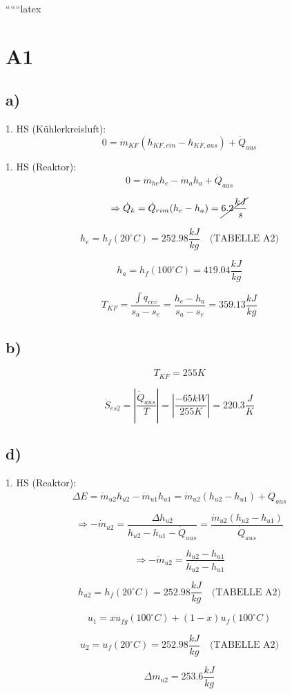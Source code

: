 
``````latex


\section*{A1}

\subsection*{a)}
1. HS (Kühlerkreisluft): \[0 = \dot{m}_{KF} (h_{KF,ein} - h_{KF,aus}) + \dot{Q}_{aus}\]

1. HS (Reaktor): \[0 = \dot{m}_{he} h_{e} - \dot{m}_{a} h_{a} + \dot{Q}_{aus}\]

\[
\Rightarrow \dot{Q}_{k} = \dot{Q}_{rim} (h_{e} - h_{a}) = \cancel{6.2 \frac{kJ}{s}}
\]

\[
h_{e} = h_{f} (20^\circ C) = 252.98 \frac{kJ}{kg} \quad \text{(TABELLE A2)}
\]

\[
h_{a} = h_{f} (100^\circ C) = 419.04 \frac{kJ}{kg}
\]

\[
T_{KF} = \frac{\int q_{rev}}{s_{a} - s_{e}} = \frac{h_{e} - h_{a}}{s_{a} - s_{e}} = 359.13 \frac{kJ}{kg}
\]

\subsection*{b)}
\[
T_{KF} = 255 K
\]

\[
\dot{S}_{es2} = \left| \frac{\dot{Q}_{aus}}{T} \right| = \left| \frac{-65 kW}{255 K} \right| = 220.3 \frac{J}{K}
\]

\subsection*{d)}
1. HS (Reaktor): \[\Delta E = \dot{m}_{u2} h_{u2} - \dot{m}_{u1} h_{u1} = \dot{m}_{u2} (h_{u2} - h_{u1}) + \dot{Q}_{aus}\]

\[
\Rightarrow -\dot{m}_{u2} = \frac{\Delta h_{u2}}{h_{u2} - h_{u1} - \dot{Q}_{aus}} = \frac{\dot{m}_{u2} (h_{u2} - h_{u1})}{\dot{Q}_{aus}}
\]

\[
\Rightarrow -\dot{m}_{u2} = \frac{h_{u2} - h_{u1}}{h_{u2} - h_{u1}}
\]

\[
h_{u2} = h_{f} (20^\circ C) = 252.98 \frac{kJ}{kg} \quad \text{(TABELLE A2)}
\]

\[
u_{1} = x u_{fg} (100^\circ C) + (1 - x) u_{f} (100^\circ C)
\]

\[
u_{2} = u_{f} (20^\circ C) = 252.98 \frac{kJ}{kg} \quad \text{(TABELLE A2)}
\]

\[
\Delta m_{u2} = 253.6 \frac{kJ}{kg}
\]

